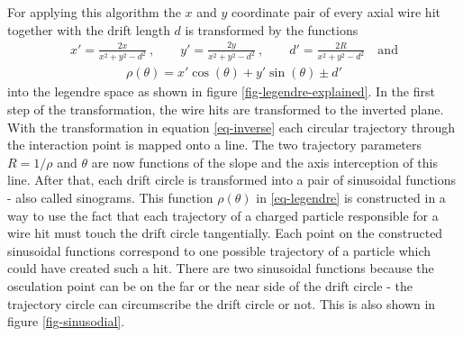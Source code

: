 For applying this algorithm the $x$ and $y$ coordinate pair of every axial wire hit together with the drift length $d$ is transformed by the functions
\begin{align} x' = \frac{2x}{x^2 + y^2 - d^2}\ , \qquad y' = \frac{2y}{x^2 + y^2 - d^2}\ ,  \qquad d' = \frac{2R}{x^2 + y^2 - d^2}\quad \text{and} \label{eq-inverse} \end{align}
\begin{align}\rho(\theta) = x' \cos(\theta) + y' \sin(\theta) \pm d' \label{eq-legendre}\end{align}
into the legendre space as shown in figure \ref{fig-legendre-explained}. In the first step of the transformation, the wire hits are transformed to the inverted plane. With the transformation in equation \ref{eq-inverse} each circular trajectory through the interaction point is mapped onto a line. The two trajectory parameters $R = 1/\rho$ and $\theta$ are now functions of the slope and the axis interception of this line. After that, each drift circle is transformed into a pair of sinusoidal functions - also called sinograms. This function $\rho(\theta)$ in \ref{eq-legendre} is constructed in a way to use the fact that each trajectory of a charged particle responsible for a wire hit must touch the drift circle tangentially. Each point on the constructed sinusoidal functions correspond to one possible trajectory of a particle which could have created such a hit. There are two sinusoidal functions because the osculation point can be on the far or the near side of the drift circle - the trajectory circle can circumscribe the drift circle or not. This is also shown in figure \ref{fig-sinusodial}.

